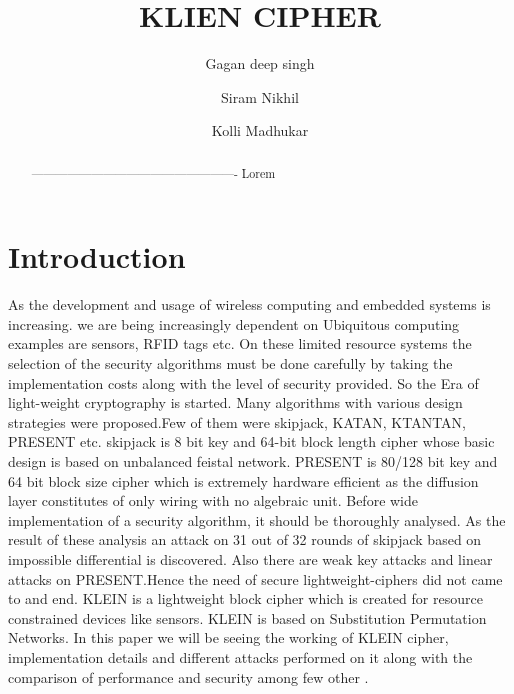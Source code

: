 \documentclass[preprint]{transcrypto}
\author{Gagan deep singh\inst{1} \and Siram Nikhil\inst{1} \and Kolli Madhukar\inst{1}}
\institute{
 Indian Institute of Technology, Bhilai, India 
}
\title{KLIEN CIPHER}
\begin{document}
\maketitle


\begin{abstract}
  ---------------------------------------------------- Lorem
\end{abstract}


\section{Introduction}
As the development and usage of wireless computing and embedded systems is increasing. we are being increasingly dependent on Ubiquitous computing examples are sensors, RFID tags etc. On these limited resource systems the selection of the security algorithms must be done carefully by taking the implementation costs along with the level of security provided. So the Era of light-weight cryptography is started. Many algorithms with various design strategies were proposed.Few of them were skipjack, KATAN, KTANTAN, PRESENT etc. skipjack is 8 bit key and 64-bit block length cipher whose basic design is based on unbalanced feistal network. PRESENT is 80/128 bit key and 64 bit block size cipher  which is extremely hardware efficient as the diffusion layer constitutes of only wiring with no algebraic unit.
Before wide implementation of a security algorithm, it should be thoroughly analysed. As the result of these analysis an attack on 31 out of 32 rounds of skipjack based on impossible differential is discovered. Also there are weak key attacks and linear attacks on PRESENT.Hence the need of secure lightweight-ciphers did not came to and end. KLEIN is a lightweight block cipher which is created for resource constrained devices like sensors. KLEIN is based on Substitution Permutation Networks. In this paper we will be seeing the working of KLEIN cipher, implementation details and different attacks performed on it along with the comparison of performance and security among few other .
\end{document}

